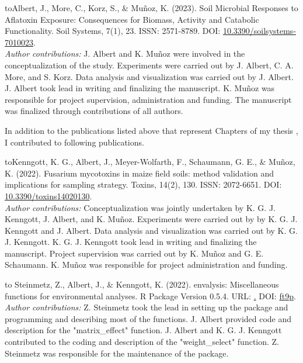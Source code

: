 {\parindent2cm \hangindent\parindent\noindent\hbox toAlbert, J., More, C., Korz, S., \& Muñoz, K. (2023). Soil Microbial Responses to Aflatoxin Exposure: Consequences for Biomass, Activity and Catabolic Functionality. Soil Systems, 7(1), 23. ISSN: 2571-8789. DOI: \href{https://doi.org/10.3390/soilsystems7010023}{10.3390/soilsystems-7010023}.\\[5pt]
\textit{Author contributions:} J. Albert and K. Muñoz were involved in the conceptualization of the study. Experiments were carried out by J. Albert, C. A. More, and S. Korz. Data analysis and visualization was carried out by J. Albert. J. Albert took lead in writing and finalizing the manuscript. K. Muñoz was responsible for project supervision, administration and funding. The manuscript was finalized through contributions of all authors. \par}

\hfill 

In addition to the publications listed above that represent Chapters of my thesis , I contributed to following publications. %

{\parindent2cm \hangindent\parindent\noindent\hbox toKenngott, K. G., Albert, J., Meyer-Wolfarth, F., Schaumann, G. E., \& Muñoz, K. (2022). Fusarium mycotoxins in maize field soils: method validation and implications for sampling strategy. Toxins, 14(2), 130. ISSN: 2072-6651. DOI: \href{https://doi.org/10.3390/toxins14020130}{10.3390/toxins14020130}.\\[5pt]
\textit{Author contributions:} Conceptualization was jointly undertaken by K. G. J. Kenngott, J. Albert, and K. Muñoz. Experiments were carried out by by K. G. J. Kenngott and J. Albert. Data analysis and visualization was carried out by K. G. J. Kenngott. K. G. J. Kenngott took lead in writing and finalizing the manuscript. Project supervision was carried out by  K. Muñoz and G. E. Schaumann. K. Muñoz was responsible for project administration and funding.
\par}

{\parindent2cm \hangindent\parindent\noindent\hbox to Steinmetz, Z., Albert, J., \& Kenngott, K. (2022). envalysis: Miscellaneous functions for environmental analyses. R Package Version 0.5.4. URL: \href{https://CRAN.R-project.org/package=envalysis}. DOI: \href{https://doi.org/ft9p}{ft9p}.\\[5pt] 
\textit{Author contributions:} Z. Steinmetz took the lead in setting up the package and programming and describing most of the functions. J. Albert provided code and description for the "matrix\_effect" function. J. Albert and K. G. J. Kenngott contributed to the coding and description of the "weight\_select" function. Z. Steinmetz was responsible for the maintenance of the package.
\par}